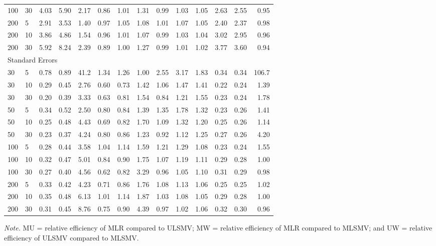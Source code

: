 \documentclass[man, noextraspace, 12pt]{apa7}
\begin{document}
\begin{table}[!htp]
\begin{threeparttable}
\begin{tabular}{llrrrrrrrrrrrr}
  100 & 30 & 4.03 & 5.90 & 2.17 & 0.86 & 1.01 & 1.31 & 0.99 & 1.03 & 1.05 & 2.63 & 2.55 & 0.95 \\ 
  200 & 5 & 2.91 & 3.53 & 1.40 & 0.97 & 1.05 & 1.08 & 1.01 & 1.07 & 1.05 & 2.40 & 2.37 & 0.98 \\ 
  200 & 10 & 3.86 & 4.86 & 1.54 & 0.96 & 1.01 & 1.07 & 0.99 & 1.03 & 1.04 & 3.02 & 2.95 & 0.96 \\ 
  200 & 30 & 5.92 & 8.24 & 2.39 & 0.89 & 1.00 & 1.27 & 0.99 & 1.01 & 1.02 & 3.77 & 3.60 & 0.94 \\ 
\multicolumn{14}{l}{Standard Errors}\\
30 & 5 & 0.78 & 0.89 & 41.2 & 1.34 & 1.26 & 1.00 & 2.55 & 3.17 & 1.83 & 0.34 & 0.34 & 106.7 \\ 
  30 & 10 & 0.29 & 0.45 & 2.76 & 0.60 & 0.73 & 1.42 & 1.06 & 1.47 & 1.41 & 0.22 & 0.24 & 1.39 \\ 
  30 & 30 & 0.20 & 0.39 & 3.33 & 0.63 & 0.81 & 1.54 & 0.84 & 1.21 & 1.55 & 0.23 & 0.24 & 1.78 \\ 
  50 & 5 & 0.34 & 0.52 & 2.50 & 0.80 & 0.84 & 1.39 & 1.35 & 1.78 & 1.32 & 0.23 & 0.26 & 1.41 \\ 
  50 & 10 & 0.25 & 0.48 & 4.43 & 0.69 & 0.82 & 1.70 & 1.09 & 1.32 & 1.20 & 0.25 & 0.26 & 1.14 \\ 
  50 & 30 & 0.23 & 0.37 & 4.24 & 0.80 & 0.86 & 1.23 & 0.92 & 1.12 & 1.25 & 0.27 & 0.26 & 4.20 \\ 
  100 & 5 & 0.28 & 0.44 & 3.58 & 1.04 & 1.14 & 1.59 & 1.21 & 1.29 & 1.08 & 0.23 & 0.24 & 1.55 \\ 
  100 & 10 & 0.32 & 0.47 & 5.01 & 0.84 & 0.90 & 1.75 & 1.07 & 1.19 & 1.11 & 0.29 & 0.28 & 1.00 \\ 
  100 & 30 & 0.27 & 0.40 & 4.56 & 0.62 & 0.82 & 3.29 & 0.96 & 1.05 & 1.10 & 0.31 & 0.29 & 0.98 \\ 
  200 & 5 & 0.33 & 0.42 & 4.23 & 0.71 & 0.86 & 1.76 & 1.08 & 1.13 & 1.06 & 0.25 & 0.25 & 1.02 \\ 
  200 & 10 & 0.35 & 0.48 & 6.13 & 1.01 & 1.14 & 1.87 & 1.03 & 1.08 & 1.05 & 0.29 & 0.28 & 1.00 \\ 
  200 & 30 & 0.31 & 0.45 & 8.76 & 0.75 & 0.90 & 4.39 & 0.97 & 1.02 & 1.06 & 0.32 & 0.30 & 0.96 \\ 
   \bottomrule
\end{tabular}
 \vspace*{1mm}
 	\begin{tablenotes}
    {\small
        \textit{Note.} MU = relative efficiency of MLR compared to ULSMV; MW = relative efficiency of MLR compared to MLSMV; and UW = relative efficiency of ULSMV compared to MLSMV.
    }
 	\end{tablenotes}
 \end{threeparttable}
\end{table}
\end{document}
